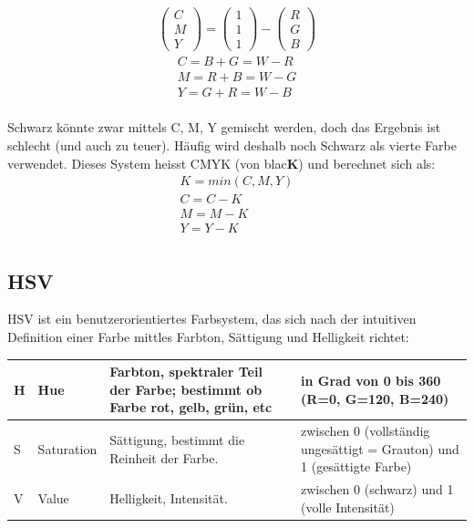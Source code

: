 \begin{gather*}
\begin{pmatrix} C \\ M \\ Y \end{pmatrix} = 
\begin{pmatrix} 1 \\ 1 \\ 1 \end{pmatrix} -
\begin{pmatrix} R \\ G \\ B \end{pmatrix}
\end{gather*}
\begin{gather*}
C = B + G = W - R \\
M = R + B = W - G \\
Y = G + R = W - B \\
\end{gather*}

\noindent
Schwarz könnte zwar mittels C, M, Y gemischt werden, doch das Ergebnis ist schlecht (und auch zu teuer). Häufig wird deshalb noch Schwarz als vierte Farbe verwendet. Dieses System heisst CMYK (von blac\textbf{K}) und berechnet sich als:
\begin{gather*}
K = min(C, M, Y )\\
C = C - K \\
M = M - K \\
Y = Y - K \\
\end{gather*}

\subsection{HSV} 
HSV ist ein benutzerorientiertes Farbsystem, das sich nach der intuitiven Definition einer Farbe mittles Farbton, Sättigung und Helligkeit richtet:
\begin{center}
\begin{tabular}{ | l | l | p{7cm} | p{6cm} |}
\hline
H & Hue        & Farbton, spektraler Teil der Farbe; bestimmt ob Farbe rot, gelb, grün, etc & in Grad von 0 bis 360  (R=0, G=120, B=240)                              \\ \hline
S & Saturation & Sättigung, bestimmt die Reinheit der Farbe.                                & zwischen 0 (vollständig ungesättigt = Grauton) und 1 (gesättigte Farbe) \\ \hline
V & Value      & Helligkeit, Intensität.                                                    & zwischen 0 (schwarz) und 1 (volle Intensität)   \\     
\hline
\end{tabular}
\end{center}

